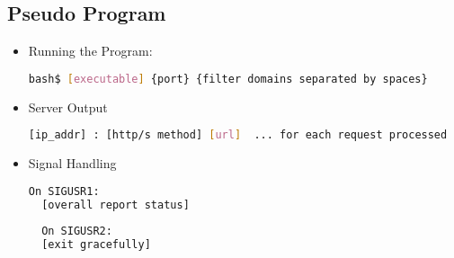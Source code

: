 \documentclass{article}
\begin{document}
\subsection{Pseudo Program}
\begin{itemize}
\item Running the Program:
  \begin{lstlisting}[language=bash]
  bash$ [executable] {port} {filter domains separated by spaces}
  \end{lstlisting}

\item Server Output
  \begin{lstlisting}[language=bash]
  [ip_addr] : [http/s method] [url]  ... for each request processed
  \end{lstlisting}

\item Signal Handling
  \begin{lstlisting}[language=bash]
  On SIGUSR1:
  [overall report status]
  
  On SIGUSR2:
  [exit gracefully]
  \end{lstlisting}

\end{itemize}
\end{document}

